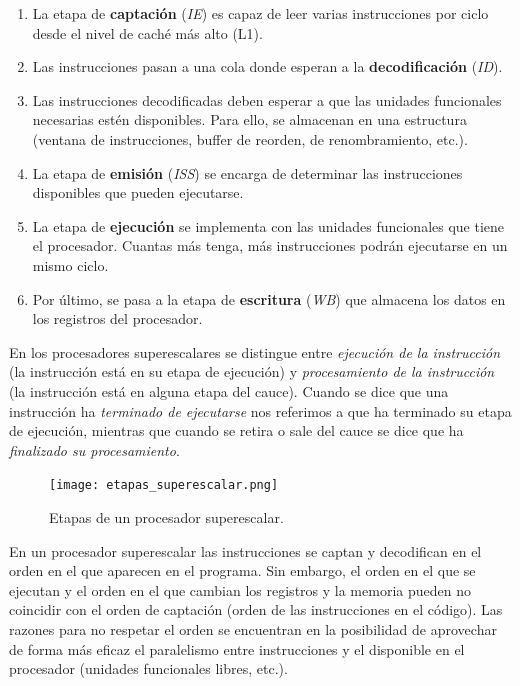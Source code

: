 \documentclass[12pt,spanish]{article}
\begin{document}
\begin{enumerate}
	\item La etapa de \textbf{captación} (\textit{IE}) es capaz de leer varias instrucciones por ciclo desde el nivel de caché más alto (L1).
	\item Las instrucciones pasan a una cola donde esperan a la \textbf{decodificación} (\textit{ID}).
	\item Las instrucciones decodificadas deben esperar a que las unidades funcionales necesarias estén disponibles. Para ello, se almacenan en una estructura (ventana de instrucciones, buffer de reorden, de renombramiento, etc.).
	\item La etapa de \textbf{emisión} (\textit{ISS}) se encarga de determinar las instrucciones disponibles que pueden ejecutarse.
	\item La etapa  de \textbf{ejecución} se implementa con las unidades funcionales que tiene el procesador. Cuantas más tenga, más instrucciones podrán ejecutarse en un mismo ciclo.
	\item Por último, se pasa a la etapa de \textbf{escritura} (\textit{WB}) que almacena los datos en los registros del procesador.
\end{enumerate}

En los procesadores superescalares se distingue entre \textit{ejecución de la instrucción} (la instrucción está en su etapa de ejecución) y \textit{procesamiento de la instrucción} (la instrucción está en alguna etapa del cauce). Cuando se dice que una instrucción ha \textit{terminado de ejecutarse} nos referimos a que ha terminado su etapa de ejecución, mientras que cuando se retira o sale del cauce se dice que ha \textit{finalizado su procesamiento}.

\begin{figure}[H]
\centering
\texttt{[image: etapas\_superescalar.png]}
\caption{Etapas de un procesador superescalar.}
\end{figure}

En un procesador superescalar las instrucciones se captan y decodifican en el orden en el que aparecen en el programa. Sin embargo, el orden en el que se ejecutan y el orden en el que cambian los registros y la memoria pueden no coincidir con el orden de captación (orden de las instrucciones en el código). Las razones para no respetar el orden se encuentran en la posibilidad de aprovechar de forma más eficaz el paralelismo entre instrucciones y el disponible en el procesador (unidades funcionales libres, etc.).\\
\end{document}
